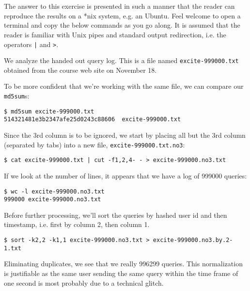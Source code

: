 
\section{}

\label{appendix:1}

The answer to this exercise is presented in such a manner that the reader can
reproduce the results on a *nix system, e.g. an Ubuntu. Feel welcome to open a
terminal and copy the below commands as you go along. It is assumed that the
reader is familiar with Unix pipes and standard output redirection, i.e. the
operators \texttt{|} and \texttt{>}.

We analyze the handed out query log. This is a file named
\texttt{excite-999000.txt} obtained from the course web site on November 18.

To be more confident that we're working with the same file, we can compare our
\texttt{md5sum}s:

\begin{lstlisting}
$ md5sum excite-999000.txt
514321481e3b2347afe25d0243c88606  excite-999000.txt
\end{lstlisting}

Since the 3rd column is to be ignored, we start by placing all but the 3rd
column (separated by tabs) into a new file, \texttt{excite-999000.txt.no3}:

\begin{lstlisting}
$ cat excite-999000.txt | cut -f1,2,4- - > excite-999000.no3.txt
\end{lstlisting}

If we look at the number of lines, it appears that we have a log of 999000
queries:

\begin{lstlisting}
$ wc -l excite-999000.no3.txt
999000 excite-999000.no3.txt
\end{lstlisting}

Before further processing, we'll sort the queries by hashed user id and then
timestamp, i.e. first by column 2, then column 1.

\begin{lstlisting}
$ sort -k2,2 -k1,1 excite-999000.no3.txt > excite-999000.no3.by.2-1.txt
\end{lstlisting}

Eliminating duplicates, we see that we really 996299 queries. This
normalization is justifiable as the same user sending the same query within the
time frame of one second is most probably due to a technical glitch.

